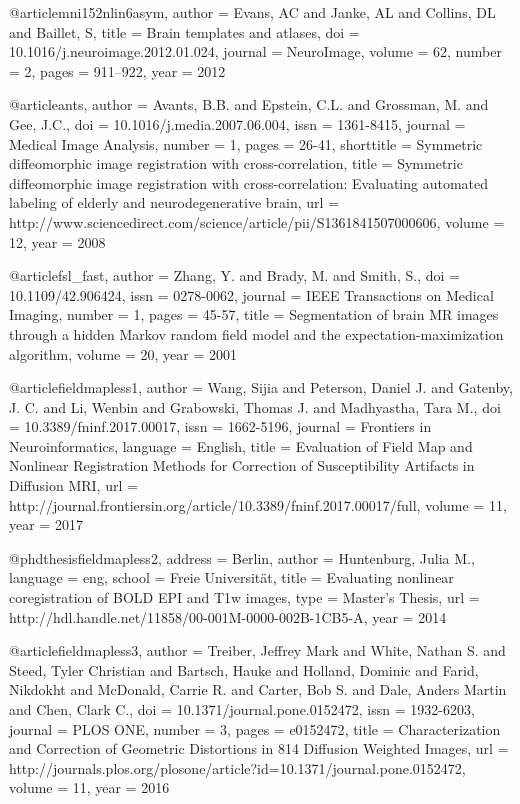 @article{mni152nlin6asym,
    author = {Evans, AC and Janke, AL and Collins, DL and Baillet, S},
    title = {Brain templates and atlases},
    doi = {10.1016/j.neuroimage.2012.01.024},
    journal = {NeuroImage},
    volume = {62},
    number = {2},
    pages = {911--922},
    year = 2012
}

@article{ants,
    author = {Avants, B.B. and Epstein, C.L. and Grossman, M. and Gee, J.C.},
    doi = {10.1016/j.media.2007.06.004},
    issn = {1361-8415},
    journal = {Medical Image Analysis},
    number = 1,
    pages = {26-41},
    shorttitle = {Symmetric diffeomorphic image registration with cross-correlation},
    title = {Symmetric diffeomorphic image registration with cross-correlation: Evaluating automated labeling of elderly and neurodegenerative brain},
    url = {http://www.sciencedirect.com/science/article/pii/S1361841507000606},
    volume = 12,
    year = 2008
}

@article{fsl_fast,
    author = {Zhang, Y. and Brady, M. and Smith, S.},
    doi = {10.1109/42.906424},
    issn = {0278-0062},
    journal = {IEEE Transactions on Medical Imaging},
    number = 1,
    pages = {45-57},
    title = {Segmentation of brain {MR} images through a hidden Markov random field model and the expectation-maximization algorithm},
    volume = 20,
    year = 2001
}


@article{fieldmapless1,
    author = {Wang, Sijia and Peterson, Daniel J. and Gatenby, J. C. and Li, Wenbin and Grabowski, Thomas J. and Madhyastha, Tara M.},
    doi = {10.3389/fninf.2017.00017},
    issn = {1662-5196},
    journal = {Frontiers in Neuroinformatics},
    language = {English},
    title = {Evaluation of Field Map and Nonlinear Registration Methods for Correction of Susceptibility Artifacts in Diffusion {MRI}},
    url = {http://journal.frontiersin.org/article/10.3389/fninf.2017.00017/full},
    volume = 11,
    year = 2017
}

@phdthesis{fieldmapless2,
    address = {Berlin},
    author = {Huntenburg, Julia M.},
    language = {eng},
    school = {Freie Universität},
    title = {Evaluating nonlinear coregistration of {BOLD} {EPI} and T1w images},
    type = {Master's Thesis},
    url = {http://hdl.handle.net/11858/00-001M-0000-002B-1CB5-A},
    year = 2014
}

@article{fieldmapless3,
    author = {Treiber, Jeffrey Mark and White, Nathan S. and Steed, Tyler Christian and Bartsch, Hauke and Holland, Dominic and Farid, Nikdokht and McDonald, Carrie R. and Carter, Bob S. and Dale, Anders Martin and Chen, Clark C.},
    doi = {10.1371/journal.pone.0152472},
    issn = {1932-6203},
    journal = {PLOS ONE},
    number = 3,
    pages = {e0152472},
    title = {Characterization and Correction of Geometric Distortions in 814 Diffusion Weighted Images},
    url = {http://journals.plos.org/plosone/article?id=10.1371/journal.pone.0152472},
    volume = 11,
    year = 2016
}

